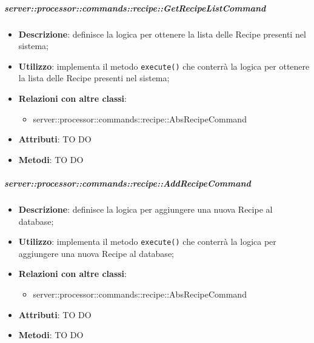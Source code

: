         \subparagraph{server::processor::commands::recipe::GetRecipeListCommand} %
        \label{subp:bdsm_app_server_processor_commands_recipe_getrecipelistcommand}
        \begin{itemize}
          \item \textbf{Descrizione}: definisce la logica per ottenere la lista delle Recipe presenti nel sistema;
          \item \textbf{Utilizzo}: implementa il metodo \texttt{execute()} che conterrà la logica per ottenere la lista delle Recipe presenti nel sistema;
          \item \textbf{Relazioni con altre classi}:
            \begin{itemize}
              \item server::processor::commands::recipe::AbsRecipeCommand
            \end{itemize}
			\item \textbf{Attributi}: TO DO
			\item \textbf{Metodi}: TO DO
        \end{itemize}

        \subparagraph{server::processor::commands::recipe::AddRecipeCommand} %
        \label{subp:bdsm_app_server_processor_commands_recipe_addrecipecommand}
        \begin{itemize}
          \item \textbf{Descrizione}: definisce la logica per aggiungere una nuova Recipe al database;
          \item \textbf{Utilizzo}: implementa il metodo \texttt{execute()} che conterrà la logica per aggiungere una nuova Recipe al database;
          \item \textbf{Relazioni con altre classi}:
            \begin{itemize}
              \item server::processor::commands::recipe::AbsRecipeCommand
            \end{itemize}
			\item \textbf{Attributi}: TO DO
			\item \textbf{Metodi}: TO DO
        \end{itemize}

